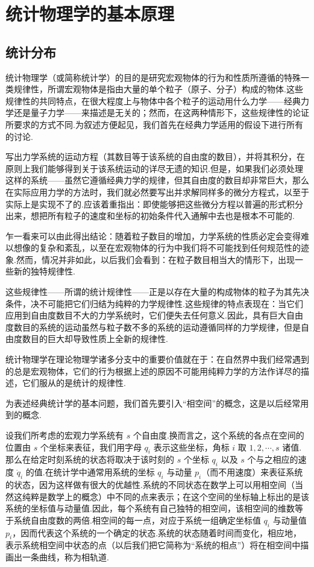 \chapter{统计物理学的基本原理}

\section{统计分布}

统计物理学（或简称统计学）的目的是研究宏观物体的行为和性质所遵循的特殊一类规律性，所谓宏观物体是指由大量的单个粒子（原子、分子）构成的物体.这些规律性的共同特点，在很大程度上与物体中各个粒子的运动用什么力学——经典力学还是量子力学——来描述是无关的；然而，在这两种情形下，这些规律性的论证所要求的方式不同.为叙述方便起见，我们首先在经典力学适用的假设下进行所有的讨论.

写出力学系统的运动方程（其数目等于该系统的自由度的数目），并将其积分，在原则上我们能够得到关于该系统运动的详尽无遗的知识.但是，如果我们必须处理这样的系统——虽然它遵循经典力学的规律，但其自由度的数目却非常巨大，那么在实际应用力学的方法时，我们就必然要写出并求解同样多的微分方程式，以至于实际上是实现不了的.应该着重指出：即使能够把这些微分方程以普遍的形式积分出来，想把所有粒子的速度和坐标的初始条件代入通解中去也是根本不可能的.

乍一看来可以由此得出结论：随着粒子数目的增加，力学系统的性质必定会变得难以想像的复杂和紊乱，以至在宏观物体的行为中我们将不可能找到任何规范性的迹象.然而，情况并非如此，以后我们会看到：在粒子数目相当大的情形下，出现一些新的独特规律性.

这些规律性——所谓的统计规律性——正是以存在大量的构成物体的粒子为其先决条件，决不可能把它们归结为纯粹的力学规律性.这些规律的特点表现在：当它们应用到自由度数目不大的力学系统时，它们便失去任何意义.因此，具有巨大自由度数目的系统的运动虽然与粒子数不多的系统的运动遵循同样的力学规律，但是自由度数目的巨大却导致性质上全新的规律性.

统计物理学在理论物理学诸多分支中的重要价值就在于：在自然界中我们经常遇到的总是宏观物体，它们的行为根据上述的原因不可能用纯粹力学的方法作详尽的描述，它们服从的是统计的规律性.

为表述经典统计学的基本问题，我们首先要引入“相空间”的概念，这是以后经常用到的概念.

设我们所考虑的宏观力学系统有 $s$ 个自由度.换而言之，这个系统的各点在空间的位置由 $s$ 个坐标来表征，我们用字母 $q_i$ 表示这些坐标，角标 $i$ 取 $1,2,\cdots,s$ 诸值.那么在给定时刻系统的状态将取决于该时刻的 $s$ 个坐标 $q_i$ 以及 $s$ 个与之相应的速度 $\dot{q}_i$ 的值.在统计学中通常用系统的坐标 $q_i$ 与动量 $p_i$（而不用速度）来表征系统的状态，因为这样做有很大的优越性.系统的不同状态在数学上可以用相空间（当然这纯粹是数学上的概念）中不同的点来表示；在这个空间的坐标轴上标出的是该系统的坐标值与动量值.因此，每个系统有自己独特的相空间，该相空间的维数等于系统自由度数的两倍.相空间的每一点，对应于系统一组确定坐标值 $q_i$ 与动量值 $p_i$，因而代表这个系统的一个确定的状态.系统的状态随着时间而变化，相应地，表示系统相空间中状态的点（以后我们把它简称为“系统的相点”）将在相空间中描画出一条曲线，称为相轨道.

